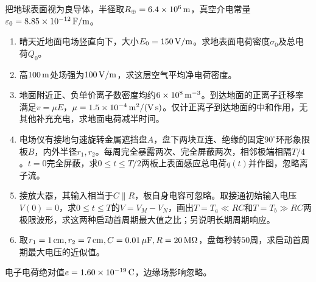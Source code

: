 \documentclass[UTF8,fontset=fandol,a4paper,11pt]{ctexart}
\begin{document}
把地球表面视为良导体，半径取$R_\oplus=6.4\times10^6\,{\rm m}$，真空介电常量$\varepsilon_0=8.85\times10^{-12}\,{\rm F/m}$。
\begin{enumerate}
\item 晴天近地面电场竖直向下，大小$E_0=150\,{\rm V/m}$。求地表面电荷密度$\sigma_0$及总电荷$Q_0$。
\item 高$100\,{\rm m}$处场强为$100\,{\rm V/m}$，求这层空气平均净电荷密度。
\item 地面附近正、负单价离子数密度均约$6\times10^8\,{\rm m^{-3}}$。到达地面的正离子迁移率满足$v=\mu E$，$\mu=1.5\times10^{-4}\,{\rm m^2/(V\,s)}$。仅计正离子到达地面的中和作用，无其他补充充电，求地面电荷减半时间。
\item 电场仪有接地匀速旋转金属遮挡盘$A$，盘下两块互连、绝缘的固定$90^\circ$环形象限板$B$，内外半径$r_1,r_2$。每周完全暴露两次、完全屏蔽两次，相邻极端相隔$T/4$。$t=0$完全屏蔽，求$0\le t\le T/2$两板上表面感应总电荷$q(t)$并作图，忽略离子流。
\item 接放大器，其输入相当于$C\parallel R$，板自身电容可忽略。取接通初始输入电压$V(0)=0$，求$0\le t\le T$的$V=V_M-V_N$，画出$T=T_a\ll RC$和$T=T_b\gg RC$两极限波形，求这两种启动首周期最大值之比；另说明长期周期响应。
\item 取$r_1=1\,{\rm cm},r_2=7\,{\rm cm},C=0.01\,\mu{\rm F},R=20\,{\rm M}\Omega$，盘每秒转$50$周，求启动首周期最大电压的近似值。
\end{enumerate}
电子电荷绝对值$e=1.60\times10^{-19}\,{\rm C}$，边缘场影响忽略。
\end{document}
